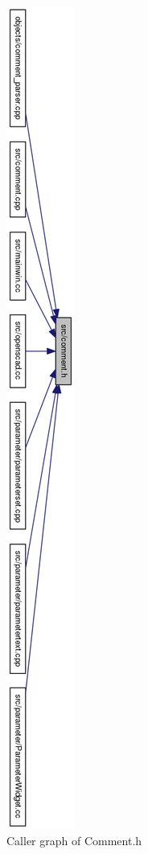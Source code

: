 \begin{figure}[H]
\centering
\includegraphics[width=0.25\linewidth,height=1.37\columnwidth]{images/comment}
\caption{Caller graph of Comment.h }
\label{fig:comment}
\end{figure}

